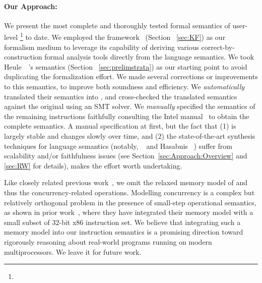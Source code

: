 \paragraph{Our Approach:}
%
We present the most complete and thoroughly tested formal semantics of user-level \footnote{} to date.
We employed the \K framework~\cite{k-primer-2013-v32} (Section ~\ref{sec:KF}) as our formalism medium to leverage its capability of deriving various correct-by-construction formal analysis tools directly from the language semantics.
We took Heule~\etal~\cite{Heule2016a}'s semantics (Section ~\ref{sec:prelimstrata}) as our starting point to avoid duplicating the formalization effort. %
We made several corrections or improvements to this semantics, to improve both soundness and efficiency.
We \emph{automatically} translated their semantics into \K, and cross-checked the translated semantics against the original using an SMT solver.
We \emph{manually} specified the semantics of the remaining instructions faithfully consulting the Intel manual~\cite{IntelManual} to obtain the complete semantics. A manual specification  at first, but the fact that (1) \ISA is largely stable and changes slowly over time, and (2) the state-of-the-art synthesis techniques for language semantics (notably, \Strata~\cite{Heule2016a} and Hasabnis \etal~\cite{Hasabnis:ASPLOS16, Hasabnis:FSE16}) suffer from scalability and/or faithfulness issues (see Section~\ref{sec:Approach:Overview} and \ref{sec:RW} for details), makes the effort worth undertaking.





Like closely related previous work~\cite{Goel:FMCAD14,Heule2016a}, we omit the relaxed memory model of \ISA and thus the concurrency-related operations.
Modelling concurrency is a complex but relatively orthogonal problem in the presence of small-step operational semantics, as shown in prior work~\cite{Sarkar:POPL09,Owens:x86-TSO}, where they have integrated their memory model with a small subset of $32$-bit x86 instruction set.
We believe that integrating such a memory model into our instruction semantics is a promising direction toward rigorously reasoning about real-world programs running on modern multiprocessors. We leave it for future work.


